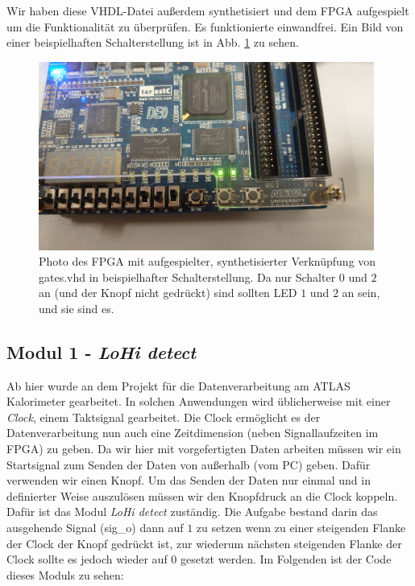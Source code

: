 Wir haben diese VHDL-Datei außerdem synthetisiert und dem FPGA aufgespielt um die Funktionalität zu überprüfen.
Es funktionierte einwandfrei.
Ein Bild von einer beispielhaften Schalterstellung ist in Abb. \ref{photo_gates} zu sehen.

\begin{figure}[ht]
	\centering
    \includegraphics[width=0.98\textwidth]{../Daten/Photo_FPGA_gates.png}
	\caption{Photo des FPGA mit aufgespielter, synthetisierter Verknüpfung von gates.vhd in beispielhafter Schalterstellung. Da nur Schalter $0$ und $2$ an (und der Knopf nicht gedrückt) sind sollten LED $1$ und $2$ an sein, und sie sind es.}
	\label{photo_gates}
\end{figure}

\subsection{Modul 1 - \textit{LoHi detect}}

Ab hier wurde an dem Projekt für die Datenverarbeitung am ATLAS Kalorimeter gearbeitet.
In solchen Anwendungen wird üblicherweise mit einer \textit{Clock}, einem Taktsignal gearbeitet.
Die Clock ermöglicht es der Datenverarbeitung nun auch eine Zeitdimension (neben Signallaufzeiten im FPGA) zu geben.
Da wir hier mit vorgefertigten Daten arbeiten müssen wir ein Startsignal zum Senden der Daten von außerhalb (vom PC) geben.
Dafür verwenden wir einen Knopf.
Um das Senden der Daten nur einmal und in definierter Weise auszulösen müssen wir den Knopfdruck an die Clock koppeln.
Dafür ist das Modul \textit{LoHi detect} zuständig.
Die Aufgabe bestand darin das ausgehende Signal (sig\_o) dann auf $1$ zu setzen wenn zu einer steigenden Flanke der Clock der Knopf gedrückt ist, zur wiederum nächsten steigenden Flanke der Clock sollte es jedoch wieder auf $0$ gesetzt werden.
Im Folgenden ist der Code dieses Moduls zu sehen:

